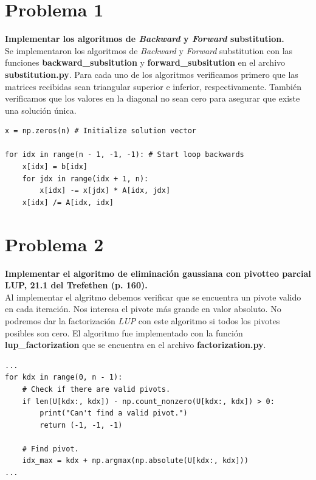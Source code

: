 \documentclass[12pt,letterpaper]{article}
\begin{document}
\section*{Problema 1}

\textbf{Implementar los algoritmos de \textit{Backward} y \textit{Forward} substitution.}\\

Se implementaron los algoritmos de \textit{Backward} y \textit{Forward} substitution con las funciones \textbf{backward\_subsitution} y \textbf{forward\_subsitution} en el archivo \textbf{substitution.py}. Para cada uno de los algoritmos verificamos primero que las matrices recibidas sean triangular superior e inferior, respectivamente. Tambi\'en verificamos que los valores en la diagonal no sean cero para asegurar que existe una soluci\'on \'unica.\\


\begin{lstlisting}[style = Python]
x = np.zeros(n) # Initialize solution vector

for idx in range(n - 1, -1, -1): # Start loop backwards
    x[idx] = b[idx]
    for jdx in range(idx + 1, n):
        x[idx] -= x[jdx] * A[idx, jdx]
    x[idx] /= A[idx, idx]
\end{lstlisting}



\section*{Problema 2}

\textbf{Implementar el algoritmo de eliminaci\'on gaussiana con pivotteo parcial LUP, 21.1 del Trefethen (p. 160).}\\

Al implementar el algritmo debemos verificar que se encuentra un pivote valido en cada iteraci\'on. Nos interesa el pivote m\'as grande en valor absoluto. No podremos dar la factorizaci\'on \textit{LUP} con este algoritmo si todos los pivotes posibles son cero. El algoritmo fue implementado con la funci\'on \textbf{lup\_factorization} que se encuentra en el archivo \textbf{factorization.py}.

\begin{lstlisting}[style = Python]
...
for kdx in range(0, n - 1):
    # Check if there are valid pivots.
    if len(U[kdx:, kdx]) - np.count_nonzero(U[kdx:, kdx]) > 0:
        print("Can't find a valid pivot.")
        return (-1, -1, -1)

    # Find pivot.
    idx_max = kdx + np.argmax(np.absolute(U[kdx:, kdx]))
...
\end{lstlisting}
\end{document}
